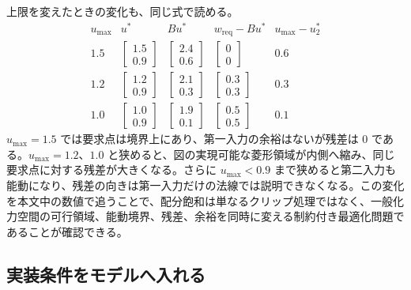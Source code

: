 上限を変えたときの変化も、同じ式で読める。
\begin{equation}
  \begin{array}{c|c|c|c|c}
    u_{\max}
    &u^*
    &Bu^*
    &w_{\mathrm{req}}-Bu^*
    &u_{\max}-u_2^*\\ \hline
    1.5
    &\begin{bmatrix}1.5\\0.9\end{bmatrix}
    &\begin{bmatrix}2.4\\0.6\end{bmatrix}
    &\begin{bmatrix}0\\0\end{bmatrix}
    &0.6\\
    1.2
    &\begin{bmatrix}1.2\\0.9\end{bmatrix}
    &\begin{bmatrix}2.1\\0.3\end{bmatrix}
    &\begin{bmatrix}0.3\\0.3\end{bmatrix}
    &0.3\\
    1.0
    &\begin{bmatrix}1.0\\0.9\end{bmatrix}
    &\begin{bmatrix}1.9\\0.1\end{bmatrix}
    &\begin{bmatrix}0.5\\0.5\end{bmatrix}
    &0.1
  \end{array}
\end{equation}
$u_{\max}=1.5$ では要求点は境界上にあり、第一入力の余裕はないが残差は 0 である。$u_{\max}=1.2$、$1.0$ と狭めると、図の実現可能な菱形領域が内側へ縮み、同じ要求点に対する残差が大きくなる。さらに $u_{\max}<0.9$ まで狭めると第二入力も能動になり、残差の向きは第一入力だけの法線では説明できなくなる。この変化を本文中の数値で追うことで、配分飽和は単なるクリップ処理ではなく、一般化力空間の可行領域、能動境界、残差、余裕を同時に変える制約付き最適化問題であることが確認できる。

\subsection{実装条件をモデルへ入れる}

